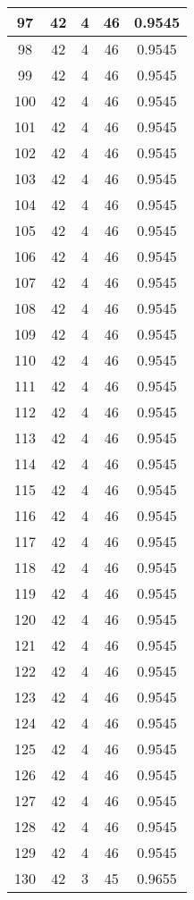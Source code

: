\documentclass[letterpaper, 12pt]{article}
\begin{document}
\begin{longtable}{|c|c|c|c|c|}
\hline
97 & 42 & 4 & 46 & 0.9545 \\
\hline
98 & 42 & 4 & 46 & 0.9545 \\
\hline
99 & 42 & 4 & 46 & 0.9545 \\
\hline
100 & 42 & 4 & 46 & 0.9545 \\
\hline
101 & 42 & 4 & 46 & 0.9545 \\
\hline
102 & 42 & 4 & 46 & 0.9545 \\
\hline
103 & 42 & 4 & 46 & 0.9545 \\
\hline
104 & 42 & 4 & 46 & 0.9545 \\
\hline
105 & 42 & 4 & 46 & 0.9545 \\
\hline
106 & 42 & 4 & 46 & 0.9545 \\
\hline
107 & 42 & 4 & 46 & 0.9545 \\
\hline
108 & 42 & 4 & 46 & 0.9545 \\
\hline
109 & 42 & 4 & 46 & 0.9545 \\
\hline
110 & 42 & 4 & 46 & 0.9545 \\
\hline
111 & 42 & 4 & 46 & 0.9545 \\
\hline
112 & 42 & 4 & 46 & 0.9545 \\
\hline
113 & 42 & 4 & 46 & 0.9545 \\
\hline
114 & 42 & 4 & 46 & 0.9545 \\
\hline
115 & 42 & 4 & 46 & 0.9545 \\
\hline
116 & 42 & 4 & 46 & 0.9545 \\
\hline
117 & 42 & 4 & 46 & 0.9545 \\
\hline
118 & 42 & 4 & 46 & 0.9545 \\
\hline
119 & 42 & 4 & 46 & 0.9545 \\
\hline
120 & 42 & 4 & 46 & 0.9545 \\
\hline
121 & 42 & 4 & 46 & 0.9545 \\
\hline
122 & 42 & 4 & 46 & 0.9545 \\
\hline
123 & 42 & 4 & 46 & 0.9545 \\
\hline
124 & 42 & 4 & 46 & 0.9545 \\
\hline
125 & 42 & 4 & 46 & 0.9545 \\
\hline
126 & 42 & 4 & 46 & 0.9545 \\
\hline
127 & 42 & 4 & 46 & 0.9545 \\
\hline
128 & 42 & 4 & 46 & 0.9545 \\
\hline
129 & 42 & 4 & 46 & 0.9545 \\
\hline
130 & 42 & 3 & 45 & 0.9655 \\

\end{longtable}
\end{document}
